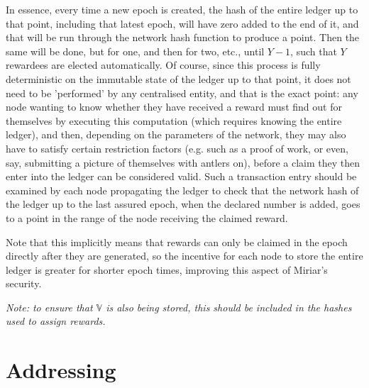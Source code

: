 \documentclass{extreport}
\begin{document}
In essence, every time a new epoch is created, the hash of the entire ledger up to that point, including that latest epoch, will have zero added to the end of it, and that will be run through the network hash function to produce a point. Then the same will be done, but for one, and then for two, etc., until \(Y - 1\), such that \(Y\) rewardees are elected automatically. Of course, since this process is fully deterministic on the immutable state of the ledger up to that point, it does not need to be 'performed' by any centralised entity, and that is the exact point: any node wanting to know whether they have received a reward must find out for themselves by executing this computation (which requires knowing the entire ledger), and then, depending on the parameters of the network, they may also have to satisfy certain restriction factors (e.g. such as a proof of work, or even, say, submitting a picture of themselves with antlers on), before a claim they then enter into the ledger can be considered valid. Such a transaction entry should be examined by each node propagating the ledger to check that the network hash of the ledger up to the last assured epoch, when the declared number is added, goes to a point in the range of the node receiving the claimed reward.

Note that this implicitly means that rewards can only be claimed in the epoch directly after they are generated, so the incentive for each node to store the entire ledger is greater for shorter epoch times, improving this aspect of Miriar's security.

\emph{Note: to ensure that \(\mathbb{V}\) is also being stored, this should be included in the hashes used to assign rewards.}

\chapter{Addressing}
\label{sec:org9928c7d}
\end{document}
